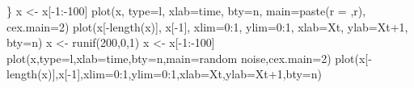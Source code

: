 \documentclass[
  a4paper,
  DIV=11,
  numbers=noendperiod,
  oneside]{scrreprt}
\newenvironment{Shaded}{}{}
\newcommand{\AttributeTok}[1]{\textcolor[rgb]{0.84,0.23,0.29}{#1}}
\newcommand{\DecValTok}[1]{\textcolor[rgb]{0.00,0.36,0.77}{#1}}
\newcommand{\FunctionTok}[1]{\textcolor[rgb]{0.44,0.26,0.76}{#1}}
\newcommand{\NormalTok}[1]{\textcolor[rgb]{0.14,0.16,0.18}{#1}}
\newcommand{\OtherTok}[1]{\textcolor[rgb]{0.44,0.26,0.76}{#1}}
\newcommand{\SpecialCharTok}[1]{\textcolor[rgb]{0.00,0.36,0.77}{#1}}
\newcommand{\StringTok}[1]{\textcolor[rgb]{0.01,0.18,0.38}{#1}}
\begin{document}
\begin{Shaded}
\begin{Highlighting}[]
\NormalTok{\}}
\NormalTok{x }\OtherTok{\textless{}{-}}\NormalTok{ x[}\SpecialCharTok{{-}}\DecValTok{1}\SpecialCharTok{:{-}}\DecValTok{100}\NormalTok{]}
\FunctionTok{plot}\NormalTok{(x, }\AttributeTok{type=}\StringTok{\textquotesingle{}l\textquotesingle{}}\NormalTok{, }\AttributeTok{xlab=}\StringTok{\textquotesingle{}time\textquotesingle{}}\NormalTok{, }\AttributeTok{bty=}\StringTok{\textquotesingle{}n\textquotesingle{}}\NormalTok{, }\AttributeTok{main=}\FunctionTok{paste}\NormalTok{(}\StringTok{\textquotesingle{}r = \textquotesingle{}}\NormalTok{,r), }\AttributeTok{cex.main=}\DecValTok{2}\NormalTok{) }
\FunctionTok{plot}\NormalTok{(x[}\SpecialCharTok{{-}}\FunctionTok{length}\NormalTok{(x)], x[}\SpecialCharTok{{-}}\DecValTok{1}\NormalTok{], }\AttributeTok{xlim=}\DecValTok{0}\SpecialCharTok{:}\DecValTok{1}\NormalTok{, }\AttributeTok{ylim=}\DecValTok{0}\SpecialCharTok{:}\DecValTok{1}\NormalTok{, }\AttributeTok{xlab=}\StringTok{\textquotesingle{}Xt\textquotesingle{}}\NormalTok{, }\AttributeTok{ylab=}\StringTok{\textquotesingle{}Xt+1\textquotesingle{}}\NormalTok{, }\AttributeTok{bty=}\StringTok{\textquotesingle{}n\textquotesingle{}}\NormalTok{)}
\NormalTok{x }\OtherTok{\textless{}{-}} \FunctionTok{runif}\NormalTok{(}\DecValTok{200}\NormalTok{,}\DecValTok{0}\NormalTok{,}\DecValTok{1}\NormalTok{)}
\NormalTok{x }\OtherTok{\textless{}{-}}\NormalTok{ x[}\SpecialCharTok{{-}}\DecValTok{1}\SpecialCharTok{:{-}}\DecValTok{100}\NormalTok{]}
\FunctionTok{plot}\NormalTok{(x,}\AttributeTok{type=}\StringTok{\textquotesingle{}l\textquotesingle{}}\NormalTok{,}\AttributeTok{xlab=}\StringTok{\textquotesingle{}time\textquotesingle{}}\NormalTok{,}\AttributeTok{bty=}\StringTok{\textquotesingle{}n\textquotesingle{}}\NormalTok{,}\AttributeTok{main=}\StringTok{\textquotesingle{}random noise\textquotesingle{}}\NormalTok{,}\AttributeTok{cex.main=}\DecValTok{2}\NormalTok{) }
\FunctionTok{plot}\NormalTok{(x[}\SpecialCharTok{{-}}\FunctionTok{length}\NormalTok{(x)],x[}\SpecialCharTok{{-}}\DecValTok{1}\NormalTok{],}\AttributeTok{xlim=}\DecValTok{0}\SpecialCharTok{:}\DecValTok{1}\NormalTok{,}\AttributeTok{ylim=}\DecValTok{0}\SpecialCharTok{:}\DecValTok{1}\NormalTok{,}\AttributeTok{xlab=}\StringTok{\textquotesingle{}Xt\textquotesingle{}}\NormalTok{,}\AttributeTok{ylab=}\StringTok{\textquotesingle{}Xt+1\textquotesingle{}}\NormalTok{,}\AttributeTok{bty=}\StringTok{\textquotesingle{}n\textquotesingle{}}\NormalTok{)}
\end{Highlighting}
\end{Shaded}
\end{document}
